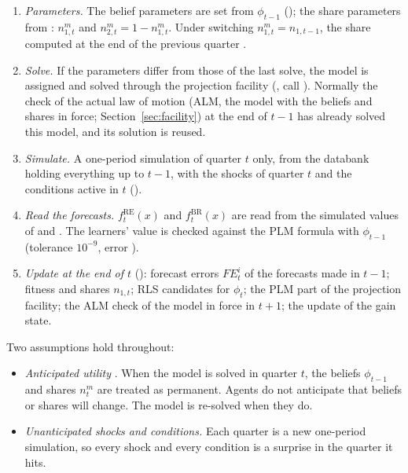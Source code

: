 \documentclass[11pt,a4paper]{article}
\newcommand{\RE}{\mathrm{RE}}
\newcommand{\BR}{\mathrm{BR}}
\newcommand{\fRE}{f^{\RE}}
\newcommand{\fBR}{f^{\BR}}
\newcommand{\FE}{\mathit{FE}}
\begin{document}
\begin{enumerate}[nosep]
  \item \emph{Parameters.} The belief parameters are set from $\phi_{t-1}$
        (); the share parameters from
        : $n^m_{1,t}$ and $n^m_{2,t} = 1-n^m_{1,t}$.
        Under switching $n^m_{1,t} = n_{1,t-1}$, the share computed at the end of the previous
        quarter \citep[eq.~16]{ozden2025}.
  \item \emph{Solve.} If the parameters differ from those of the last solve, the model is
        assigned and solved through the projection facility (,
        call ). Normally the check of the actual law of motion (ALM, the model
        with the beliefs and shares in force; Section~\ref{sec:facility}) at the end of $t-1$
        has already solved this model, and its solution is reused.
  \item \emph{Simulate.} A one-period simulation of quarter $t$ only, from the databank holding everything up to
        $t-1$, with the shocks of quarter $t$ and the conditions active in $t$
        ().
  \item \emph{Read the forecasts.} $\fRE_t(x)$ and $\fBR_t(x)$ are read from the simulated
        values of  and . The learners' value is checked
        against the PLM formula with $\phi_{t-1}$ (tolerance $10^{-9}$, error
        ).
  \item \emph{Update at the end of $t$} (): forecast errors
        $\FE^i_t$ of the forecasts made in $t-1$; fitness and shares $n_{1,t}$; RLS
        candidates for $\phi_t$; the PLM part of the projection facility; the ALM check of the
        model in force in $t+1$; the update of the gain state.
\end{enumerate}

Two assumptions hold throughout:
\begin{itemize}[nosep]
  \item \emph{Anticipated utility} \citep{kreps1998}. When the model is solved in quarter
        $t$, the beliefs $\phi_{t-1}$ and shares $n^m_t$ are treated as permanent. Agents do
        not anticipate that beliefs or shares will change. The model is re-solved when they do.
  \item \emph{Unanticipated shocks and conditions.} Each quarter is a new one-period
        simulation, so every shock and every condition is a surprise in the quarter it hits.
\end{itemize}
\end{document}
